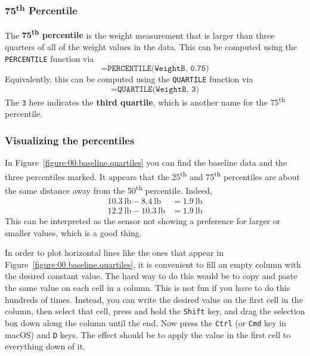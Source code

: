 \subsubsection{75\textsuperscript{th} Percentile}
%
The \textbf{75\textsuperscript{th} percentile} is the weight measurement that is larger than three quarters of all of the weight values in the data. This can be computed using the \texttt{PERCENTILE} function via
\begin{equation}
    \texttt{=PERCENTILE(WeightB, 0.75)}
    \label{eq:00.percentile.75}
\end{equation}
Equivalently, this can be computed using the \texttt{QUARTILE} function via
\begin{equation}
    \texttt{=QUARTILE(WeightB, 3)}
\end{equation}
The \texttt{3} here indicates the \textbf{third quartile}, which is another name for the 75\textsuperscript{th} percentile.
%
\subsubsection{Visualizing the percentiles}
%
In Figure~\ref{figure:00.baseline.quartiles} you can find the baseline data and the three percentiles marked. It appears that the 25\textsuperscript{th} and 75\textsuperscript{th} percentiles are about the same distance away from the 50\textsuperscript{th} percentile. Indeed,
\begin{align}
    10.3 \ \text{lb} - 8.4 \ \text{lb} &= 1.9 \ \text{lb} \\
    12.2 \ \text{lb} - 10.3 \ \text{lb} &= 1.9 \ \text{lb}
\end{align}
This can be interpreted as the sensor not showing a preference for larger or smaller values, which is a good thing.

In order to plot horizontal lines like the ones that appear in Figure~\ref{figure:00.baseline.quartiles}, it is convenient to fill an empty column with the desired constant value. The hard way to do this would be to copy and paste the same value on each cell in a column. This is not fun if you have to do this hundreds of times. Instead, you can write the desired value on the first cell in the column, then select that cell, press and hold the \texttt{Shift} key, and drag the selection box down along the column until the end. Now press the \texttt{Ctrl} (or \texttt{Cmd} key in macOS) and \texttt{D} keys. The effect should be to apply the value in the first cell to everything down of it.
%
